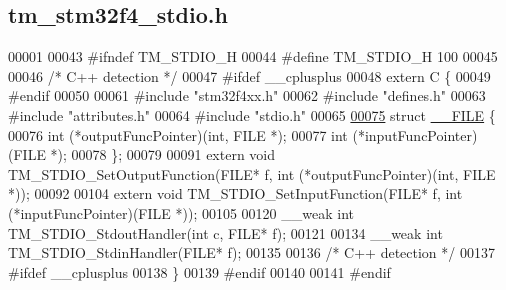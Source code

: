 \hypertarget{tm__stm32f4__stdio_8h_source}{}\subsection{tm\+\_\+stm32f4\+\_\+stdio.\+h}

\begin{DoxyCode}
00001 
00043 \textcolor{preprocessor}{#ifndef TM\_STDIO\_H}
00044 \textcolor{preprocessor}{#define TM\_STDIO\_H 100}
00045 
00046 \textcolor{comment}{/* C++ detection */}
00047 \textcolor{preprocessor}{#ifdef \_\_cplusplus}
00048 \textcolor{keyword}{extern} C \{
00049 \textcolor{preprocessor}{#endif}
00050 
00061 \textcolor{preprocessor}{#include "stm32f4xx.h"}
00062 \textcolor{preprocessor}{#include "defines.h"}
00063 \textcolor{preprocessor}{#include "attributes.h"}
00064 \textcolor{preprocessor}{#include "stdio.h"}
00065 
\hypertarget{tm__stm32f4__stdio_8h_source_l00075}{}\hyperlink{struct_____f_i_l_e}{00075} \textcolor{keyword}{struct }\hyperlink{struct_____f_i_l_e}{\_\_FILE} \{
00076     int (*outputFuncPointer)(int, FILE *);
00077     int (*inputFuncPointer)(FILE *);
00078 \};
00079 
00091 \textcolor{keyword}{extern} \textcolor{keywordtype}{void} TM\_STDIO\_SetOutputFunction(FILE* f, \textcolor{keywordtype}{int} (*outputFuncPointer)(\textcolor{keywordtype}{int}, FILE *));
00092 
00104 \textcolor{keyword}{extern} \textcolor{keywordtype}{void} TM\_STDIO\_SetInputFunction(FILE* f, \textcolor{keywordtype}{int} (*inputFuncPointer)(FILE *));
00105 
00120 \_\_weak \textcolor{keywordtype}{int} TM\_STDIO\_StdoutHandler(\textcolor{keywordtype}{int} c, FILE* f);
00121 
00134 \_\_weak \textcolor{keywordtype}{int} TM\_STDIO\_StdinHandler(FILE* f);
00135 
00136 \textcolor{comment}{/* C++ detection */}
00137 \textcolor{preprocessor}{#ifdef \_\_cplusplus}
00138 \}
00139 \textcolor{preprocessor}{#endif}
00140 
00141 \textcolor{preprocessor}{#endif}
\end{DoxyCode}
